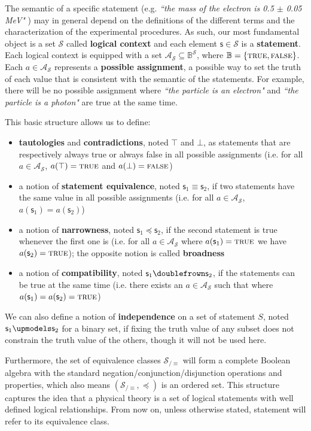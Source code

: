 \documentclass{article}
\def\Bool{\mathbb{B}}
\def\TRUE{\textsc{true}}
\def\FALSE{\textsc{false}}
\def\logCtx{\mathcal{S}}
\newcommand{\pAss}[1][\mathcal{S}] {\mathcal{A}_{#1}}
\def\tautology{\top} %
\def\contradiction{\bot} %
\newcommand{\stmt}[1][s] {\mathsf{#1}} %
\def\comp{\doublefrown} %
\def\narrower{\preccurlyeq} %
\def\indep{\upmodels} %
\newcommand{\statement}[1] {\emph{``#1"}}
\begin{document}
The semantic of a specific statement (e.g. \statement{the mass of the electron is 0.5 $\pm$ 0.05 MeV} ) may in general depend on the definitions of the different terms and the characterization of the experimental procedures. As such, our most fundamental object is a set $\logCtx$ called \textbf{logical context} and each element $\stmt \in \logCtx$ is a \textbf{statement}. Each logical context is equipped with a set $\pAss \subseteq \Bool^\logCtx$, where $\Bool = \{ \TRUE, \FALSE \}$. Each $a \in \pAss$ represents a \textbf{possible assignment}, a possible way to set the truth of each value that is consistent with the semantic of the statements. For example, there will be no possible assignment where \statement{the particle is an electron} and \statement{the particle is a photon} are true at the same time.

This basic structure allows us to define:
\begin{itemize}
	\item \textbf{tautologies} and \textbf{contradictions}, noted $\tautology$ and $\contradiction$, as statements that are respectively always true or always false in all possible assignments (i.e. for all $a \in \pAss$, $a(\tautology) = \TRUE$ and $a(\contradiction) = \FALSE$)
	\item a notion of \textbf{statement equivalence}, noted $\stmt_1 \equiv \stmt_2$, if two statements have the same value in all possible assignments (i.e. for all $a \in \pAss$, $a(\stmt_1) = a(\stmt_2)$)
	\item a notion of \textbf{narrowness}, noted $\stmt_1 \narrower \stmt_2$, if the second statement is true whenever the first one is (i.e. for all $a \in \pAss$ where $a(\stmt_1) = \TRUE$ we have $a(\stmt_2) = \TRUE$); the opposite notion is called \textbf{broadness} 
	\item a notion of \textbf{compatibility}, noted $\stmt_1 \comp \stmt_2$, if the statements can be true at the same time (i.e. there exists an $a \in \pAss$ such that where $a(\stmt_1) = a(\stmt_2) = \TRUE$)
\end{itemize}
We can also define a notion of \textbf{independence} on a set of statement $S$, noted $\stmt_1 \indep \stmt_2$ for a binary set, if fixing the truth value of any subset does not constrain the truth value of the others, though it will not be used here.

Furthermore, the set of equivalence classes $\logCtx_{/\equiv}$ will form a complete Boolean algebra with the standard negation/conjunction/disjunction operations and properties, which also means $(\logCtx_{/\equiv}, \narrower)$ is an ordered set. This structure captures the idea that a physical theory is a set of logical statements with well defined logical relationships. From now on, unless otherwise stated, statement will refer to its equivalence class.
\end{document}
